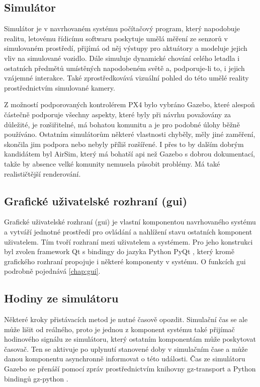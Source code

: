     \subsection{Simulátor}
      Simulátor je v navrhovaném systému počítačový program, který napodobuje realitu, letovému řídicímu softwaru poskytuje umělá měření ze senzorů v simulovaném prostředí, přijímá od něj výstupy pro aktuátory a modeluje jejich vliv na simulované vozidlo. Dále simuluje dynamické chování celého letadla i ostatních předmětů umístěných napodobeném světě a, podporuje-li to, i jejich vzájemné interakce. Také zprostředkovává vizuální pohled do této umělé reality prostřednictvím simulované kamery.

      Z možností podporovaných kontrolérem PX4 bylo vybráno Gazebo, které alespoň částečně podporuje všechny aspekty, které byly při návrhu považovány za důležité, je rozšiřitelné, má bohatou komunitu a je pro podobné úlohy běžně používáno. Ostatním simulátorům některé vlastnosti chyběly, měly jiné zaměření, skončila jim podpora nebo nebyly příliš rozšířené. I přes to by dalším dobrým kandidátem byl AirSim, který má bohatší \acrshort{api} než Gazebo s dobrou dokumentací, takže by absence velké komunity nemusela působit problémy. Má také realističtější renderování.
    \subsection{Grafické uživatelské rozhraní (\acrshort{gui})}
      Grafické uživatelské rozhraní (\acrshort{gui}) je vlastní komponentou navrhovaného systému a vytváří jednotné prostředí pro ovládání a nahlížení stavu ostatních komponent uživatelem. Tím tvoří rozhraní mezi uživatelem a systémem. Pro jeho konstrukci byl zvolen framework Qt s bindingy do jazyka Python PyQt \cite{pyqt}, který kromě grafického rozhraní propojuje i některé komponenty v systému. O funkcích \acrshort{gui} podrobně pojednává \cref{chap:gui}. 
    \subsection{Hodiny ze simulátoru}
      Některé kroky přistávacích metod je nutné časově opozdit. Simulační čas se ale může lišit od reálného, proto je jednou z komponent systému také přijímač hodinového signálu ze simulátoru, který ostatním komponentám může poskytovat časovač. Ten se aktivuje po uplynutí stanovené doby v simulačním čase a může danou komponentu asynchronně informovat o této události. Čas ze simulátoru Gazebo se přenáší pomocí zpráv prostřednictvím knihovny gz-transport a Python bindingů gz-python \cite{gz-python}. 
